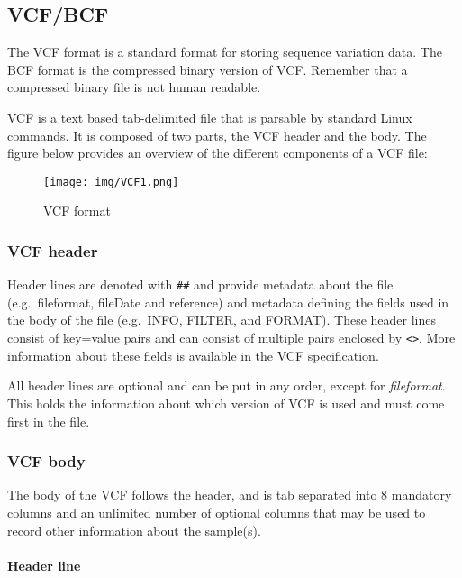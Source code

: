 \documentclass[11pt]{article}
\begin{document}
    \hypertarget{vcfbcf}{%
\subsection{VCF/BCF}\label{vcfbcf}}

The VCF format is a standard format for storing sequence variation data.
The BCF format is the compressed binary version of VCF. Remember that a
compressed binary file is not human readable.

VCF is a text based tab-delimited file that is parsable by standard
Linux commands. It is composed of two parts, the VCF header and the
body. The figure below provides an overview of the different components
of a VCF file:

    \begin{figure}
\centering
\texttt{[image: img/VCF1.png]}
\caption{VCF format}
\end{figure}

    \hypertarget{vcf-header}{%
\subsubsection{VCF header}\label{vcf-header}}

Header lines are denoted with \texttt{\#\#} and provide metadata about
the file (e.g.~fileformat, fileDate and reference) and metadata defining
the fields used in the body of the file (e.g.~INFO, FILTER, and FORMAT).
These header lines consist of key=value pairs and can consist of
multiple pairs enclosed by \texttt{\textless{}\textgreater{}}. More
information about these fields is available in the
\href{http://samtools.github.io/hts-specs/VCFv4.3.pdf}{VCF
specification}.

All header lines are optional and can be put in any order, except for
\textit{fileformat}. This holds the information about which version of VCF
is used and must come first in the file.

\hypertarget{vcf-body}{%
\subsubsection{VCF body}\label{vcf-body}}

The body of the VCF follows the header, and is tab separated into 8
mandatory columns and an unlimited number of optional columns that may
be used to record other information about the sample(s).

\hypertarget{header-line}{%
\paragraph{Header line}\label{header-line}}
\end{document}
